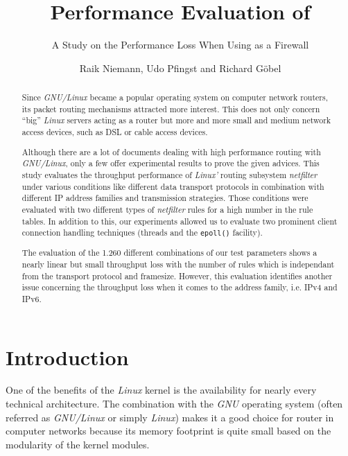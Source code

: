 \documentclass{sig-alternate}
\title{Performance Evaluation of \ttlit{netfilter}}
\subtitle{A Study on the Performance Loss When Using \subttlit{netfilter} as a
Firewall}
\author{Raik Niemann, Udo Pfingst and Richard G{\afacc\"o}bel}
\begin{document}
\maketitle

\begin{abstract}
Since \emph{GNU/Linux} became a popular operating system on computer network 
routers, its packet routing mechanisms attracted more interest. This does not 
only concern ``big'' \emph{Linux} servers acting as a router but more and more 
small and medium network access devices, such as DSL or cable access devices.

Although there are a lot of documents dealing with high performance routing 
with \emph{GNU/Linux}, only a few offer ex\-pe\-ri\-men\-tal results to prove 
the given advices. This study evaluates the throughput performance of 
\emph{Linux'} routing subsystem \emph{netfilter} under various conditions like 
different data transport protocols in combination with different IP address 
families and transmission strategies. Those conditions were evaluated with two 
different types of \emph{netfilter} rules for a high number in the rule tables. 
In addition to this, our ex\-pe\-ri\-ments allowed us to evaluate two prominent 
client connection handling techniques (threads and the \texttt{epoll()} 
facility).

The evaluation of the 1.260 different combinations of our test parameters shows 
a nearly linear but small throughput loss with the number of rules which is 
independant from the transport protocol and framesize. However, this evaluation 
identifies another issue concerning the throughput loss when it comes to the 
address family, i.e. IPv4 and IPv6.
\end{abstract}


\section{Introduction}
\noindent One of the benefits of the \emph{Linux} kernel is the availability for
nearly every technical architecture. The combination with the \emph{GNU}
operating system (often referred as \emph{GNU/Linux} or simply \emph{Linux})
makes it a good choice for router in computer networks because its memory
footprint is quite small based on the modularity of the kernel modules.
\end{document}
